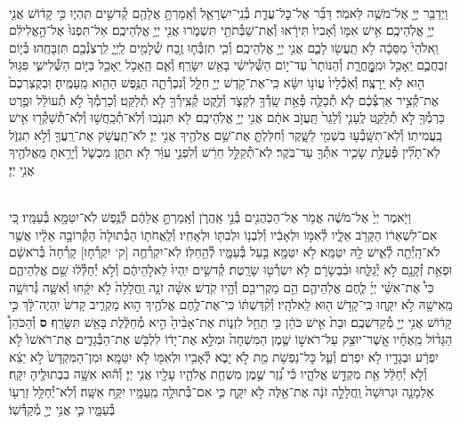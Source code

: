 \documentclass[twoside, openany, parskip=half, 11pt]{book}
\begin{document}
\begin{footnotesize}
\begin{multicols}{2}
\\
וַיְדַבֵּ֥ר יְיָ֖ אֶל־מֹשֶׁ֥ה לֵּאמֹֽר׃ דַּבֵּ֞ר אֶל־כׇּל־עֲדַ֧ת בְּ֯נֵֽי־יִשְׂרָאֵ֛ל וְ֯אָֽמַרְתָּ֥ אֲלֵהֶ֖ם קְ֯דשִׁ֣ים תִּֽהְי֑וּ כִּ֣י קָד֔וֹשׁ אֲנִ֖י יְיָ֥ אֱלֹֽהֵיכֶֽם׃ אִ֣ישׁ אִמּ֤וֹ וְ֯אָבִיו֙ תִּירָ֔אוּ וְ֯אֶת־שַׁבְּ֯תֹתַ֖י תִּשְׁמֹ֑רוּ אֲנִ֖י יְיָ֥ אֱלֹֽהֵיכֶֽם׃ אַל־תִּפְנוּ֙ אֶל־הָ֣אֱלִילִ֔ם וֵֽאלֹהֵי֙ מַסֵּכָ֔ה לֹ֥א תַֽעֲשׂ֖וּ לָכֶ֑ם אֲנִ֖י יְיָ֥ אֱלֹֽהֵיכֶֽם׃  וְ֯כִ֧י תִזְבְּ֯ח֛וּ זֶ֥בַח שְׁ֯לָמִ֖ים לַֽיְיָ֑ לִֽרְצֹֽנְ֯כֶ֖ם תִּזְבָּחֻֽהוּ׃ בְּ֯י֧וֹם זִבְחֲכֶ֛ם יֵֽאָכֵ֖ל וּמִֽמׇׇׇׇׇׇׇׇׇׇׇׇּֽחֳרָ֑ת וְ֯הַנּוֹתָר֙ עַד־י֣וֹם הַשְּׁ֯לִישִׁ֔י בָּאֵ֖שׁ יִשָּׂרֵֽף׃ וְ֯אִ֛ם הֵֽאָכֹ֥ל יֵֽאָכֵ֖ל בַּיּ֣וֹם הַשְּׁ֯לִישִׁ֑י פִּגּ֥וּל ה֖וּא לֹ֥א יֵֽרָצֶֽה׃ וְ֯אֹֽכְ֯לָיו֙ עֲוֹנ֣וֹ יִשָּׂ֔א כִּֽי־אֶת־קֹ֥דֶשׁ יְיָ֖ חִלֵּ֑ל וְ֯נִכְרְ֯תָ֛ה הַנֶּ֥פֶשׁ הַהִ֖וא מֵֽעַמֶּֽיהָ׃ וּֽבְקֻצְרְכֶם֙ אֶת־קְ֯צִ֣יר אַרְצְ֯כֶ֔ם לֹ֧א תְ֯כַלֶּ֛ה פְּ֯אַ֥ת שָֽׂדְ֯ךָ֖ לִקְצֹ֑ר וְ֯לֶ֥קֶט קְ֯צִֽירְ֯ךָ֖ לֹ֥א תְ֯לַקֵּֽט׃ וְ֯כַרְמְ֯ךָ֙ לֹ֣א תְ֯עוֹלֵ֔ל וּפֶ֥רֶט כַּרְמְ֯ךָ֖ לֹ֣א תְ֯לַקֵּ֑ט לֶֽעָנִ֤י וְ֯לַגֵּר֙ תַּֽעֲזֹ֣ב אֹתָ֔ם אֲנִ֖י יְיָ֥ אֱלֹֽהֵיכֶֽם׃  לֹ֖א תִּגְנֹ֑בוּ וְ֯לֹֽא־תְ֯כַֽחֲשׁ֥וּ וְ֯לֹֽא־תְ֯שַׁקְּ֯ר֖וּ אִ֥ישׁ בַּֽעֲמִיתֽוֹ׃ וְ֯לֹֽא־תִשָּֽׁבְ֯ע֥וּ בִשְׁמִ֖י לַשָּׁ֑קֶר וְ֯חִלַּלְתָּ֛ אֶת־שֵׁ֥ם אֱלֹהֶ֖יךָ אֲנִ֥י יְיָ׃ לֹא־תַֽעֲשֹׁ֥ק אֶת־רֵֽעֲךָ֖ וְ֯לֹ֣א תִגְזֹ֑ל לֹֽא־תָלִ֞ין פְּ֯עֻלַּ֥ת שָׂכִ֛יר אִתְּ֯ךָ֖ עַד־בֹּֽקֶר׃ לֹֽא־תְ֯קַלֵּ֣ל חֵרֵ֔שׁ וְ֯לִפְנֵ֣י עִוֵּ֔ר לֹ֥א תִתֵּ֖ן מִכְשֹׁ֑ל וְ֯יָרֵ֥אתָ מֵּֽאֱלֹהֶ֖יךָ אֲנִ֥י יְיָ׃

\\
וַיֹּ֤אמֶר יְיָ֙ אֶל־מֹשֶׁ֔ה אֱמֹ֥ר אֶל־הַכֹּֽהֲנִ֖ים בְּ֯נֵ֣י אַֽהֲרֹ֑ן וְ֯אָֽמַרְתָּ֣ אֲלֵהֶ֔ם לְ֯נֶ֥פֶשׁ לֹֽא־יִטַּמָּ֖א בְּ֯עַמָּֽיו׃ כִּ֚י אִם־לִשְׁאֵר֔וֹ הַקָּרֹ֖ב אֵלָ֑יו לְ֯אִמּ֣וֹ וּלְאָבִ֔יו וְ֯לִבְנ֥וֹ וּלְבִתּ֖וֹ וּלְאָחִֽיו׃ וְ֯לַֽאֲחֹת֤וֹ הַבְּ֯תוּלָה֙ הַקְּ֯רוֹבָ֣ה אֵלָ֔יו אֲשֶׁ֥ר לֹא־הָֽיְ֯תָ֖ה לְ֯אִ֑ישׁ לָ֖הּ יִטַּמָּֽא׃ לֹ֥א יִטַּמָּ֖א בַּ֣עַל בְּ֯עַמָּ֑יו לְ֯הֵ֖חַלּֽוֹ׃ לֹֽא־יִקְרְ֯חֻ֤ה [ק‘ יִקְרְ֯ח֤וּ] קָרְ֯חָה֙ בְּ֯רֹאשָׁ֔ם וּפְאַ֥ת זְ֯קָנָ֖ם לֹ֣א יְ֯גַלֵּ֑חוּ וּבִ֨בְשָׂרָ֔ם לֹ֥א יִשְׂרְ֯ט֖וּ שָׂרָֽטֶת׃ קְ֯דשִׁ֤ים יִֽהְיוּ֙ לֵאלֹ֣הֵיהֶ֔ם וְ֯לֹ֣א יְ֯חַלְּ֯ל֔וּ שֵׁ֖ם אֱלֹֽהֵיהֶ֑ם כִּי֩ אֶת־אִשֵּׁ֨י יְיָ֜ לֶ֧חֶם אֱלֹֽהֵיהֶ֛ם הֵ֥ם מַקְרִיבִ֖ם וְ֯הָ֥יוּ קֹֽדֶשׁ׃  אִשָּׁ֨ה זֹנָ֤ה וַֽחֲלָלָה֙ לֹ֣א יִקָּ֔חוּ וְ֯אִשָּׁ֛ה גְּ֯רוּשָׁ֥ה מֵֽאִישָׁ֖הּ לֹ֣א יִקָּ֑חוּ כִּֽי־קָדֹ֥שׁ ה֖וּא לֵֽאלֹהָֽיו׃ וְ֯קִ֨דַּשְׁתּ֔וֹ כִּֽי־אֶת־לֶ֥חֶם אֱלֹהֶ֖יךָ ה֣וּא מַקְרִ֑יב קָדשׁ֙ יִֽהְיֶה־לָּ֔ךְ כִּ֣י קָד֔וֹשׁ אֲנִ֥י יְיָ֖ מְ֯קַדִּשְׁכֶֽם׃ וּבַת֙ אִ֣ישׁ כֹּהֵ֔ן כִּ֥י תֵחֵ֖ל לִזְנ֑וֹת אֶת־אָבִ֨יהָ֙ הִ֣יא מְ֯חַלֶּ֔לֶת בָּאֵ֖שׁ תִּשָּׂרֵֽף׃ \textbf{ס} וְ֯הַכֹּהֵן֩ הַגָּד֨וֹל מֵֽאֶחָ֜יו אֲֽשֶׁר־יוּצַ֥ק עַל־רֹאשׁ֣וֹ שֶׁ֤מֶן הַמִּשְׁחָה֙ וּמִלֵּ֣א אֶת־יָד֔וֹ לִלְבֹּ֖שׁ אֶת־הַבְּ֯גָדִ֑ים אֶת־רֹאשׁוֹ֙ לֹ֣א יִפְרָ֔ע וּבְגָדָ֖יו לֹ֥א יִפְרֹֽם׃ וְ֯עַ֛ל כׇּל־נַפְשֹׁ֥ת מֵ֖ת לֹ֣א יָבֹ֑א לְ֯אָבִ֥יו וּלְאִמּ֖וֹ לֹ֥א יִטַּמָּֽא׃ וּמִן־הַמִּקְדָּשׁ֙ לֹ֣א יֵצֵ֔א וְ֯לֹ֣א יְ֯חַלֵּ֔ל אֵ֖ת מִקְדַּ֣שׁ אֱלֹהָ֑יו כִּ֡י נֵ֠זֶר שֶׁ֣מֶן מִשְׁחַ֧ת אֱלֹהָ֛יו עָלָ֖יו אֲנִ֥י יְיָ׃  וְ֯ה֕וּא אִשָּׁ֥ה בִבְתוּלֶ֖יהָ יִקָּֽח׃ אַלְמָנָ֤ה וּגְרוּשָׁה֙ וַֽחֲלָלָ֣ה זֹנָ֔ה אֶת־אֵ֖לֶּה לֹ֣א יִקָּ֑ח כִּ֛י אִם־בְּ֯תוּלָ֥ה מֵֽעַמָּ֖יו יִקַּ֥ח אִשָּֽׁה׃ וְ֯לֹֽא־יְ֯חַלֵּ֥ל זַרְע֖וֹ בְּ֯עַמָּ֑יו כִּ֛י אֲנִ֥י יְיָ֖ מְ֯קַדְּ֯שֽׁוֹ׃


\end{multicols}
\end{footnotesize}
\end{document}
